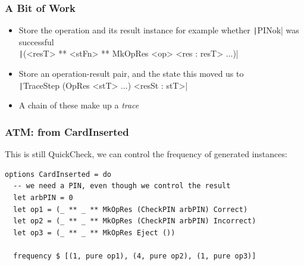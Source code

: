 \documentclass[compress]{beamer}
\begin{document}
\begin{frame}[fragile]
  \frametitle{A Bit of Work}

  \large

  \begin{itemize}
    \item<1-> Store the operation and its result instance {\textemdash} for
              example whether \texttt|PINok| was successful\\
              \texttt|(<resT> ** <stFn> ** MkOpRes <op> <res : resT> ...)|
    \item<2-> Store an operation-result pair, and the state this moved
              us to\\
              \texttt|TraceStep (OpRes <stT> ...) <resSt : stT>|
    \item<3-> A chain of these make up a \emph{trace}
  \end{itemize}

\end{frame}





\begin{frame}[fragile]
  \frametitle{ATM: from CardInserted}

  \large

  This is still QuickCheck, we can control the frequency of generated instances:

  \begin{verbatim}
options CardInserted = do
  -- we need a PIN, even though we control the result
  let arbPIN = 0
  let op1 = (_ ** _ ** MkOpRes (CheckPIN arbPIN) Correct)
  let op2 = (_ ** _ ** MkOpRes (CheckPIN arbPIN) Incorrect)
  let op3 = (_ ** _ ** MkOpRes Eject ())

  frequency $ [(1, pure op1), (4, pure op2), (1, pure op3)]
  \end{verbatim}

\end{frame}
\end{document}
